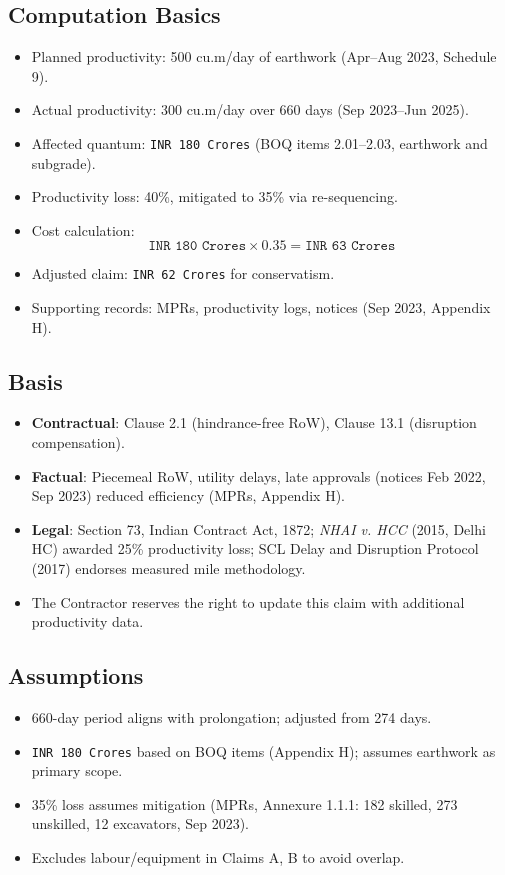 \documentclass[12pt,letterpaper]{article}
\begin{document}
	\subsection*{Computation Basics}
	\begin{itemize}
		\item Planned productivity: 500 cu.m/day of earthwork (Apr--Aug 2023, Schedule 9).
		\item Actual productivity: 300 cu.m/day over 660 days (Sep 2023--Jun 2025).
		\item Affected quantum: \texttt{INR 180 Crores} (BOQ items 2.01--2.03, earthwork and subgrade).
		\item Productivity loss: 40\%, mitigated to 35\% via re-sequencing.
		\item Cost calculation:
		\[
		\texttt{INR 180 Crores} \times 0.35 = \texttt{INR 63 Crores}
		\]
		\item Adjusted claim: \texttt{INR 62 Crores} for conservatism.
		\item Supporting records: MPRs, productivity logs, notices (Sep 2023, Appendix H).
	\end{itemize}
	
	\subsection*{Basis}
	\begin{itemize}
		\item \textbf{Contractual}: Clause 2.1 (hindrance-free RoW), Clause 13.1 (disruption compensation).
		\item \textbf{Factual}: Piecemeal RoW, utility delays, late approvals (notices Feb 2022, Sep 2023) reduced efficiency (MPRs, Appendix H).
		\item \textbf{Legal}: Section 73, Indian Contract Act, 1872; \textit{NHAI v. HCC} (2015, Delhi HC) awarded 25\% productivity loss; SCL Delay and Disruption Protocol (2017) endorses measured mile methodology.
		\item The Contractor reserves the right to update this claim with additional productivity data.
	\end{itemize}
	
	\subsection*{Assumptions}
	\begin{itemize}
		\item 660-day period aligns with prolongation; adjusted from 274 days.
		\item \texttt{INR 180 Crores} based on BOQ items (Appendix H); assumes earthwork as primary scope.
		\item 35\% loss assumes mitigation (MPRs, Annexure 1.1.1: 182 skilled, 273 unskilled, 12 excavators, Sep 2023).
		\item Excludes labour/equipment in Claims A, B to avoid overlap.
	\end{itemize}
	
\end{document}

